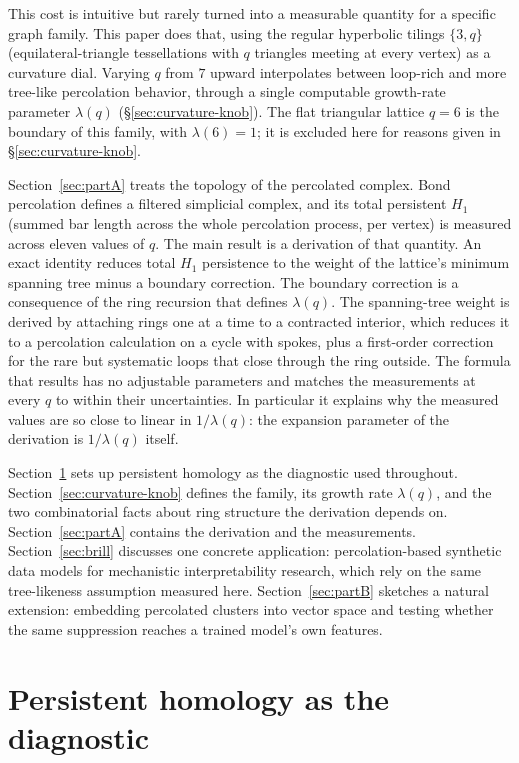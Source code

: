 \documentclass[11pt]{article}
\begin{document}
This cost is intuitive but rarely turned into a measurable quantity for a specific graph family. This paper does that, using the regular hyperbolic tilings $\{3,q\}$ (equilateral-triangle tessellations with $q$ triangles meeting at every vertex) as a curvature dial. Varying $q$ from $7$ upward interpolates between loop-rich and more tree-like percolation behavior, through a single computable growth-rate parameter $\lambda(q)$ (\S\ref{sec:curvature-knob}). The flat triangular lattice $q=6$ is the boundary of this family, with $\lambda(6)=1$; it is excluded here for reasons given in \S\ref{sec:curvature-knob}.

Section~\ref{sec:partA} treats the topology of the percolated complex. Bond percolation defines a filtered simplicial complex, and its total persistent $H_1$ (summed bar length across the whole percolation process, per vertex) is measured across eleven values of $q$. The main result is a derivation of that quantity. An exact identity reduces total $H_1$ persistence to the weight of the lattice's minimum spanning tree minus a boundary correction. The boundary correction is a consequence of the ring recursion that defines $\lambda(q)$. The spanning-tree weight is derived by attaching rings one at a time to a contracted interior, which reduces it to a percolation calculation on a cycle with spokes, plus a first-order correction for the rare but systematic loops that close through the ring outside. The formula that results has no adjustable parameters and matches the measurements at every $q$ to within their uncertainties. In particular it explains why the measured values are so close to linear in $1/\lambda(q)$: the expansion parameter of the derivation is $1/\lambda(q)$ itself.

Section~\ref{sec:diagnostic} sets up persistent homology as the diagnostic used throughout. Section~\ref{sec:curvature-knob} defines the family, its growth rate $\lambda(q)$, and the two combinatorial facts about ring structure the derivation depends on. Section~\ref{sec:partA} contains the derivation and the measurements. Section~\ref{sec:brill} discusses one concrete application: percolation-based synthetic data models for mechanistic interpretability research, which rely on the same tree-likeness assumption measured here. Section~\ref{sec:partB} sketches a natural extension: embedding percolated clusters into vector space and testing whether the same suppression reaches a trained model's own features.

\section{Persistent homology as the diagnostic}
\label{sec:diagnostic}
\end{document}
